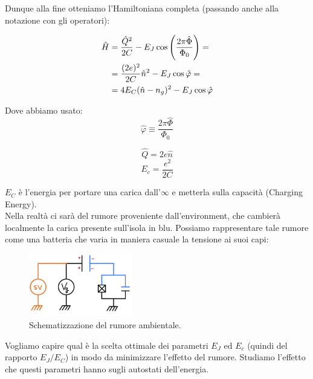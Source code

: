 \documentclass[10pt,a4paper]{article}
\begin{document}
Dunque alla fine otteniamo l'Hamiltoniana completa (passando anche alla notazione con gli operatori):






\begin{align} 
\hat{H} &= 
\dfrac{\hat{Q}^2}{2C}-E_J\cos\left(\dfrac{2\pi\hat{\Phi}}{\Phi_0}\right) = \notag\\ 
&= \dfrac{(2e)^2}{2C}\hat{n}^2 - E_J\cos\hat{\varphi}= \notag\\
&=4E_C(\hat{n}-n_g)^2 - E_J\cos\hat{\varphi}
\label{Hfin}
\end{align}

Dove abbiamo usato:
$$ \hat{\varphi} \equiv \dfrac{2\pi\hat{\Phi}}{\Phi_0} $$


$$ \hat{Q} = 2e\hat{n} $$
$$ E_c = \dfrac{e^2}{2C}$$


$E_C$ è l'energia per portare una carica dall'$\infty$ e metterla sulla capacità (Charging Energy).\\

Nella realtà ci sarà del rumore proveniente dall'environment, che cambierà localmente la carica presente sull'isola in blu. Possiamo rappresentare tale rumore come una batteria che varia in maniera casuale la tensione ai suoi capi:

\begin{figure}[h]
    \centering
    \includegraphics[width=0.4\textwidth]{DC_noise.JPG}
    \caption{Schematizzazione del rumore ambientale.}
    \label{dcnoise}
\end{figure}
\FloatBarrier


Vogliamo capire qual è la scelta ottimale dei parametri $E_J$ ed $E_c$ (quindi del rapporto $E_J/E_C$) in modo da minimizzare l'effetto del rumore.
Studiamo l'effetto che questi parametri hanno sugli autostati dell'energia.
\end{document}
